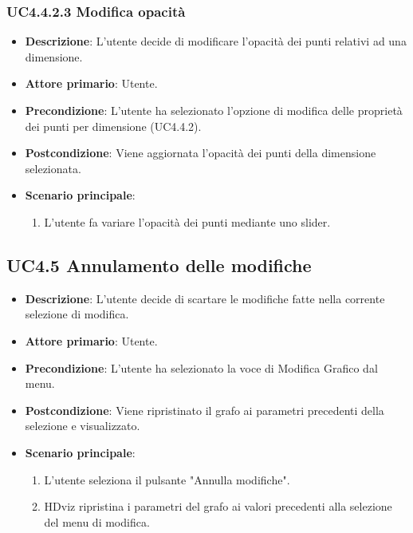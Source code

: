 \subsubsection{UC4.4.2.3 Modifica opacità}
\label{subsec:uc4.4.2.3}
\begin{itemize}
    \item \textbf{Descrizione}:  L'utente decide di modificare l'opacità dei punti relativi ad una dimensione.

	
    \item \textbf{Attore primario}: Utente.

    \item \textbf{Precondizione}: L'utente ha selezionato l'opzione di modifica delle proprietà dei punti per dimensione (UC4.4.2).
    \item \textbf{Postcondizione}:  Viene aggiornata l'opacità dei punti della dimensione selezionata.

	\item \textbf{Scenario principale}:
        \begin{enumerate}
            \item L'utente fa variare l'opacità dei punti mediante uno slider.
        \end{enumerate}
\end{itemize}


\subsection{UC4.5 Annulamento delle modifiche}

\begin{itemize}
    \item \textbf{Descrizione}: L'utente decide di scartare le modifiche fatte nella corrente selezione di modifica.

    \item \textbf{Attore primario}: Utente.
    
    \item \textbf{Precondizione}:   L'utente ha selezionato la voce di Modifica Grafico dal menu.
    \item \textbf{Postcondizione}:  Viene ripristinato il grafo ai parametri precedenti della selezione e visualizzato.

	\item \textbf{Scenario principale}:
        \begin{enumerate}

            \item L'utente seleziona il pulsante "Annulla modifiche".
            \item HDviz ripristina i parametri del grafo ai valori precedenti alla selezione del menu di modifica.
        
        \end{enumerate}
\end{itemize}




